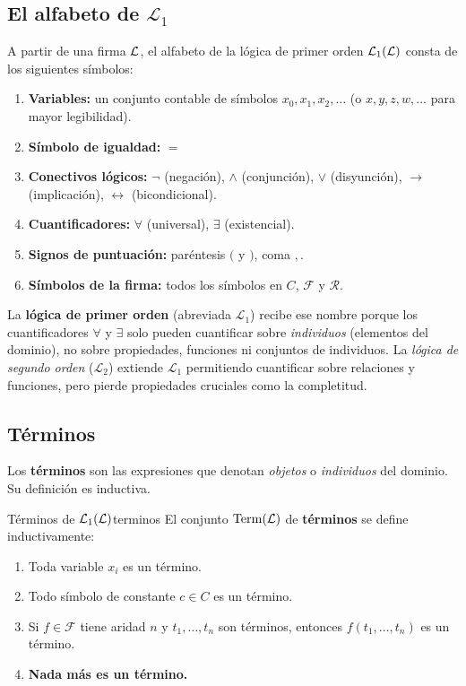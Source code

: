 \subsection{El alfabeto de \texorpdfstring{$\mathcal{L}_1$}{L1}}

A partir de una firma $\mathcal{L}$, el alfabeto de la lógica de primer orden $\mathcal{L}_1(\mathcal{L})$ consta de los siguientes símbolos:

\begin{enumerate}[leftmargin=2em, label=\textbf{\arabic*.}]
  \item \textbf{Variables:} un conjunto contable de símbolos $x_0, x_1, x_2, \ldots$ (o $x, y, z, w, \ldots$ para mayor legibilidad).
  \item \textbf{Símbolo de igualdad:} $=$
  \item \textbf{Conectivos lógicos:} $\neg$ (negación), $\wedge$ (conjunción), $\vee$ (disyunción), $\to$ (implicación), $\leftrightarrow$ (bicondicional).
  \item \textbf{Cuantificadores:} $\forall$ (universal), $\exists$ (existencial).
  \item \textbf{Signos de puntuación:} paréntesis $($ y $)$, coma $,$.
  \item \textbf{Símbolos de la firma:} todos los símbolos en $C$, $\mathcal{F}$ y $\mathcal{R}$.
\end{enumerate}

\begin{importante}
La \textbf{lógica de primer orden} (abreviada $\mathcal{L}_1$) recibe ese nombre porque los cuantificadores $\forall$ y $\exists$ solo pueden cuantificar sobre \emph{individuos} (elementos del dominio), no sobre propiedades, funciones ni conjuntos de individuos. La \emph{lógica de segundo orden} ($\mathcal{L}_2$) extiende $\mathcal{L}_1$ permitiendo cuantificar sobre relaciones y funciones, pero pierde propiedades cruciales como la completitud.
\end{importante}

\subsection{Términos}

Los \textbf{términos} son las expresiones que denotan \emph{objetos} o \emph{individuos} del dominio. Su definición es inductiva.

\begin{definicion}{Términos de $\mathcal{L}_1(\mathcal{L})$}{terminos}
El conjunto $\mathrm{Term}(\mathcal{L})$ de \textbf{términos} se define inductivamente:
\begin{enumerate}[leftmargin=2em]
  \item Toda variable $x_i$ es un término.
  \item Todo símbolo de constante $c \in C$ es un término.
  \item Si $f \in \mathcal{F}$ tiene aridad $n$ y $t_1, \ldots, t_n$ son términos, entonces $f(t_1, \ldots, t_n)$ es un término.
  \item \textbf{Nada más es un término.}
\end{enumerate}
\end{definicion}

